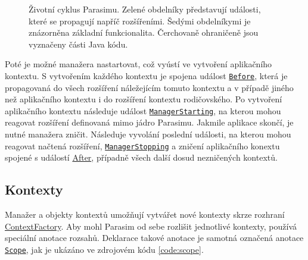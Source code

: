 \begin{figure}[h!]
\begin{center}
{}
\end{center}
\caption{Životní cyklus Parasimu. Zelené obdelníky představují události, které se propagují napříč rozšířeními.
Šedými obdelníkymi je znázorněna základní funkcionalita. Čerchovaně ohraničeně jsou vyznačeny části Java kódu.}
\end{figure}

Poté je možné manažera nastartovat, což vyústí ve vytvoření aplikačního kontextu.
S vytvořením každého kontextu je spojena událost \href{https://github.com/sybila/parasim/blob/master/core/src/main/java/org/sybila/parasim/core/event/Before.java}{\texttt{Before}}, která je propagovaná
do všech rozšíření náležejícím tomuto kontextu a v případě jiného než
aplikačního kontextu i do rozšíření kontextu rodičovského.
Po vytvoření aplikačního kontextu následuje událost \href{https://github.com/sybila/parasim/blob/master/core/src/main/java/org/sybila/parasim/core/event/ManagerStarted.java}{\texttt{ManagerStarting}},
na kterou mohou reagovat rozšíření definovaná mimo jádro Parasimu. Jakmile aplikace skončí,
je nutné manažera zničit. Následuje vyvolání poslední u\-dá\-los\-ti, na kterou mohou reagovat načtená rozšíření, \href{https://github.com/sybila/parasim/blob/master/core/src/main/java/org/sybila/parasim/core/event/ManagerStopping.java}{\texttt{ManagerStopping}}
a zničení aplikačního konextu spojené s událostí \href{https://github.com/sybila/parasim/blob/master/core/src/main/java/org/sybila/parasim/core/event/After.java}{After}, případně všech další dosud nezničených kontextů.

\subsection{Kontexty}

Manažer a objekty kontextů umožňují vytvářet nové kontexty skrze rozhraní \href{https://github.com/sybila/parasim/blob/master/core/src/main/java/org/sybila/parasim/core/api/ContextFactory.java}{ContextFactory}.
Aby mohl Parasim od se\-be rozlišit jednotlivé kontexty, používá speciální anotace
rozsahů. Deklarace takové anotace je samotná označená anotace \href{https://github.com/sybila/parasim/blob/master/core/src/main/java/org/sybila/parasim/core/annotation/Scope.java}{\texttt{Scope}},
jak je ukázáno ve zdrojovém kódu \ref{code:scope}.

